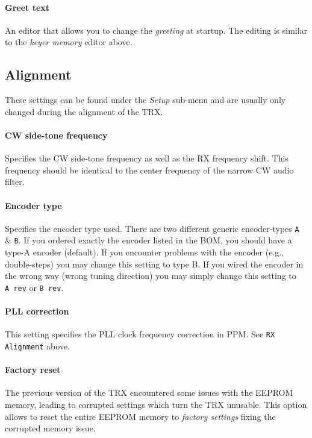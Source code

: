 \documentclass[10pt, a4paper,twoside]{scrartcl}
\begin{document}
\paragraph{Greet text}
An editor that allows you to change the \emph{greeting} at startup. The editing is similar to the \emph{keyer memory} editor above.


\subsection{Alignment}
These settings can be found under the \emph{Setup} sub-menu and are usually only changed during the alignment of the TRX. 

\paragraph{CW side-tone frequency}
Specifies the CW side-tone frequency as well as the RX frequency shift. This frequency should be identical to the center frequency of the narrow CW audio filter.

\paragraph{Encoder type}
Specifies the encoder type used. There are two different generic encoder-types \texttt{A} \& \texttt{B}. If you ordered exactly the encoder listed in the BOM, you should have a type-A encoder (default). If you encounter problems with the encoder (e.g., double-steps) you may change this setting to type B. If you wired the encoder in the wrong way (wrong tuning direction) you may simply change this setting to \texttt{A~rev} or \texttt{B~rev}. 

\paragraph{PLL correction}
This setting specifies the PLL clock frequency correction in PPM. See \texttt{RX Alignment} above.

\paragraph{Factory reset}
The previous version of the TRX encountered some issues with the EEPROM memory, leading to corrupted settings which turn the TRX unusable. This option allows to reset the entire EEPROM memory to \emph{factory settings} fixing the corrupted memory issue.
\end{document}
